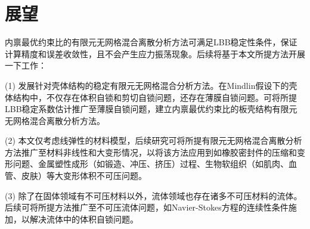 \section{展望}
内禀最优约束比的有限元无网格混合离散分析方法可满足LBB稳定性条件，保证计算精度和误差收敛性，且不会产生应力振荡现象。后续将基于本文所提方法开展一下工作：

(1) 发展针对壳体结构的稳定有限元无网格混合分析方法。在Mindlin假设下的壳体结构中，不仅存在体积自锁和剪切自锁问题，还存在薄膜自锁问题。可将所提LBB稳定系数估计推广至薄膜自锁问题，建立内禀最优约束比的板壳结构有限元无网格混合离散分析方法。

(2) 本文仅考虑线弹性的材料模型，后续研究可将所提有限元无网格混合离散分析方法推广至材料非线性和大变形情况，以将该方法应用到如橡胶密封件的压缩和变形问题、金属塑性成形（如锻造、冲压、挤压）过程、生物软组织（如肌肉、血管、皮肤）等大变形体积不可压问题。

(3) 除了在固体领域有不可压材料以外，流体领域也存在诸多不可压材料的流体。后续可将所提方法推广至不可压流体问题，如Navier-Stokes方程的连续性条件施加，以解决流体中的体积自锁问题。
